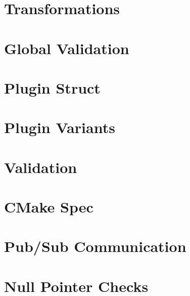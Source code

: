 \let\mypdfximage\pdfximage\def\pdfximage{\immediate\mypdfximage}\documentclass[twoside]{book}
\newcommand{\+}{\discretionary{\mbox{\scriptsize$\hookleftarrow$}}{}{}}
\begin{document}
\chapter{Transformations}
\label{doc_decisions_0_drafts_transformations_md}

\chapter{Global Validation}
\label{doc_decisions_0a_postponed_global_validation_md}

\chapter{Plugin Struct}
\label{doc_decisions_0a_postponed_plugin_struct_md}

\chapter{Plugin Variants}
\label{doc_decisions_0a_postponed_plugin_variants_md}

\chapter{Validation}
\label{doc_decisions_0a_postponed_validation_md}

\chapter{CMake Spec}
\label{doc_decisions_0b_rejected_cmake_spec_md}

\chapter{Pub/\+Sub Communication}
\label{doc_decisions_0b_rejected_elektra_web_pubsub_md}

\chapter{Null Pointer Checks}
\label{doc_decisions_0b_rejected_null_pointer_checks_md}

\end{document}
